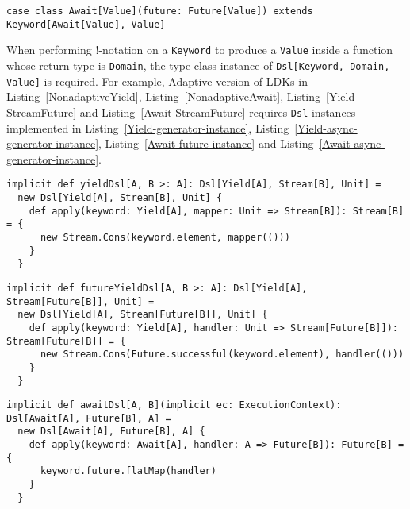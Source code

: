 \begin{lstlisting}[caption={The \lstinline{Await} LDK, the adaptive version},label={Await}]
case class Await[Value](future: Future[Value]) extends Keyword[Await[Value], Value]
\end{lstlisting}

When performing !-notation on a \lstinline{Keyword} to produce a \lstinline{Value} inside a function whose return type is \lstinline{Domain}, the type class instance of \lstinline{Dsl[Keyword, Domain, Value]} is required. For example, Adaptive version of LDKs in Listing~\ref{NonadaptiveYield},  Listing~\ref{NonadaptiveAwait},  Listing~\ref{Yield-StreamFuture} and Listing~\ref{Await-StreamFuture} requires \lstinline{Dsl} instances implemented in Listing~\ref{Yield-generator-instance}, Listing~\ref{Yield-async-generator-instance}, Listing~\ref{Await-future-instance} and Listing~\ref{Await-async-generator-instance}.

\begin{lstlisting}[caption={The \lstinline{Dsl} type class instance of \lstinline{Yield} for creating generators},label={Yield-generator-instance}]
implicit def yieldDsl[A, B >: A]: Dsl[Yield[A], Stream[B], Unit] =
  new Dsl[Yield[A], Stream[B], Unit] {
    def apply(keyword: Yield[A], mapper: Unit => Stream[B]): Stream[B] = {
      new Stream.Cons(keyword.element, mapper(()))
    }
  }
\end{lstlisting}

\begin{lstlisting}[caption={The \lstinline{Dsl} type class instance of \lstinline{Yield} for creating asynchronous generators},label={Yield-async-generator-instance}]
implicit def futureYieldDsl[A, B >: A]: Dsl[Yield[A], Stream[Future[B]], Unit] =
  new Dsl[Yield[A], Stream[Future[B]], Unit] {
    def apply(keyword: Yield[A], handler: Unit => Stream[Future[B]]): Stream[Future[B]] = {
      new Stream.Cons(Future.successful(keyword.element), handler(()))
    }
  }
\end{lstlisting}

\begin{lstlisting}[caption={The \lstinline{Dsl} type class instance of \lstinline{Await} for creating asynchronous values},label={Await-future-instance}]
implicit def awaitDsl[A, B](implicit ec: ExecutionContext): Dsl[Await[A], Future[B], A] =
  new Dsl[Await[A], Future[B], A] {
    def apply(keyword: Await[A], handler: A => Future[B]): Future[B] = {
      keyword.future.flatMap(handler)
    }
  }
\end{lstlisting}

